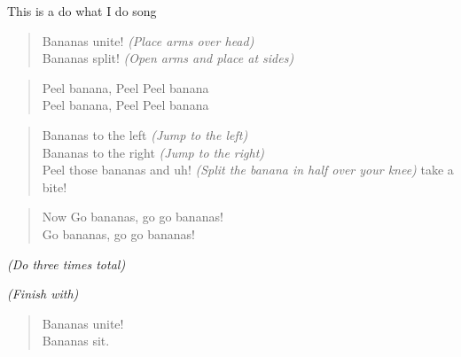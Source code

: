 
This is a do what I do song

\begin{verse}
Bananas unite! \textit{(Place arms over head)} \\
Bananas split! \textit{(Open arms and place at sides)} \\
\end{verse}

\begin{verse}
Peel banana, Peel Peel banana \\
Peel banana, Peel Peel banana \\
\end{verse}

\begin{verse}
Bananas to the left \textit{(Jump to the left)} \\
Bananas to the right \textit{(Jump to the right)} \\
Peel those bananas and uh! \textit{(Split the banana in half over your knee)} take a bite! \\
\end{verse}

\begin{verse}
Now Go bananas, go go bananas! \\
Go bananas, go go bananas! \\
\end{verse}

\textit{(Do three times total)}

\textit{(Finish with)}

\begin{verse}
Bananas unite! \\
Bananas sit. \\
\end{verse}
